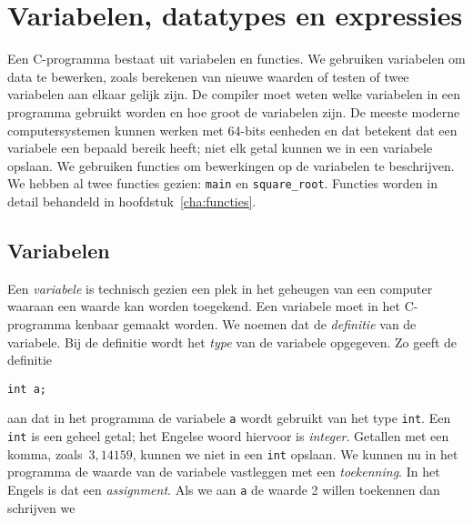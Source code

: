 \chapter{Variabelen, datatypes en expressies}
\label{cha:vardatexp}
\thispagestyle{empty}

Een C-programma bestaat uit variabelen en functies. We gebruiken variabelen om data te bewerken, zoals berekenen van nieuwe waarden of testen of twee variabelen aan elkaar gelijk zijn. De compiler moet weten welke variabelen in een programma gebruikt worden en hoe groot de variabelen zijn. De meeste moderne computersystemen kunnen werken met 64-bits eenheden en dat betekent dat een variabele een bepaald bereik heeft; niet elk getal kunnen we in een variabele opslaan.
We gebruiken functies om bewerkingen op de variabelen te beschrijven. We hebben al twee functies gezien: \texttt{main} en \texttt{square\_root}. Functies worden in detail behandeld in hoofdstuk~\ref{cha:functies}.


\section{Variabelen}
Een \textsl{variabele} is technisch gezien een plek in het geheugen van een computer waaraan een waarde kan worden toegekend. Een variabele moet in het C-programma kenbaar gemaakt worden. We noemen dat de \textsl{definitie} van de variabele. Bij de definitie wordt het \textsl{type} van de variabele opgegeven. Zo geeft de definitie

\hspace*{1em}\texttt{int a;}

aan dat in het programma de variabele \texttt{a} wordt gebruikt van het type \texttt{int}. Een \texttt{int} is een geheel getal; het Engelse woord hiervoor is \textsl{integer}. Getallen met een komma, zoals~$3,14159$, kunnen we niet in een \texttt{int} opslaan. We kunnen nu in het programma de waarde van de variabele vastleggen met een \textsl{toekenning}. In het Engels is dat een \textsl{assignment}. Als we aan \texttt{a} de waarde 2 willen toekennen dan schrijven we

